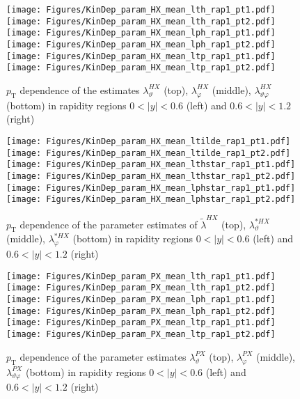 \documentclass[12pt]{article}
\newcommand{\pT}{p_\mathrm{T}}
\newcommand{\absy}{\left |  y \right |}
\newcommand{\lamthHX}{\lambda^{\scriptscriptstyle HX}_\vartheta}
\newcommand{\lamphHX}{\lambda^{\scriptscriptstyle HX}_\varphi}
\newcommand{\lamthphHX}{\lambda^{\scriptscriptstyle HX}_{\vartheta \varphi}}
\newcommand{\lamtildeHX}{\tilde{\lambda}^{\scriptscriptstyle HX}}
\newcommand{\lamthstarHX}{\lambda^{* \scriptscriptstyle HX}_\vartheta}
\newcommand{\lamphstarHX}{\lambda^{* \scriptscriptstyle HX}_\varphi}
\newcommand{\lamthPX}{\lambda^{\scriptscriptstyle PX}_\vartheta}
\newcommand{\lamphPX}{\lambda^{\scriptscriptstyle PX}_\varphi}
\newcommand{\lamthphPX}{\lambda^{\scriptscriptstyle PX}_{\vartheta \varphi}}
\begin{document}



\begin{figure}[htbp]
\centering
\texttt{[image: Figures/KinDep\_param\_HX\_mean\_lth\_rap1\_pt1.pdf]}
\texttt{[image: Figures/KinDep\_param\_HX\_mean\_lth\_rap1\_pt2.pdf]}
\texttt{[image: Figures/KinDep\_param\_HX\_mean\_lph\_rap1\_pt1.pdf]}
\texttt{[image: Figures/KinDep\_param\_HX\_mean\_lph\_rap1\_pt2.pdf]}
\texttt{[image: Figures/KinDep\_param\_HX\_mean\_ltp\_rap1\_pt1.pdf]}
\texttt{[image: Figures/KinDep\_param\_HX\_mean\_ltp\_rap1\_pt2.pdf]}
\caption{$\pT$ dependence of the estimates $\lamthHX$ (top), $\lamphHX$ (middle), $\lamthphHX$ (bottom) in rapidity regions $0<\absy<0.6$ (left) and $0.6<\absy<1.2$ (right)}
\end{figure}
\clearpage

\begin{figure}[htbp]
\centering
\texttt{[image: Figures/KinDep\_param\_HX\_mean\_ltilde\_rap1\_pt1.pdf]}
\texttt{[image: Figures/KinDep\_param\_HX\_mean\_ltilde\_rap1\_pt2.pdf]}
\texttt{[image: Figures/KinDep\_param\_HX\_mean\_lthstar\_rap1\_pt1.pdf]}
\texttt{[image: Figures/KinDep\_param\_HX\_mean\_lthstar\_rap1\_pt2.pdf]}
\texttt{[image: Figures/KinDep\_param\_HX\_mean\_lphstar\_rap1\_pt1.pdf]}
\texttt{[image: Figures/KinDep\_param\_HX\_mean\_lphstar\_rap1\_pt2.pdf]}
\caption{$\pT$ dependence of the parameter estimates of $\lamtildeHX$ (top),
$\lamthstarHX$ (middle), $\lamphstarHX$ (bottom) in rapidity regions $0<\absy<0.6$ (left) and $0.6<\absy<1.2$ (right)}
\end{figure}
\clearpage









\begin{figure}[htbp]
\centering
\texttt{[image: Figures/KinDep\_param\_PX\_mean\_lth\_rap1\_pt1.pdf]}
\texttt{[image: Figures/KinDep\_param\_PX\_mean\_lth\_rap1\_pt2.pdf]}
\texttt{[image: Figures/KinDep\_param\_PX\_mean\_lph\_rap1\_pt1.pdf]}
\texttt{[image: Figures/KinDep\_param\_PX\_mean\_lph\_rap1\_pt2.pdf]}
\texttt{[image: Figures/KinDep\_param\_PX\_mean\_ltp\_rap1\_pt1.pdf]}
\texttt{[image: Figures/KinDep\_param\_PX\_mean\_ltp\_rap1\_pt2.pdf]}
\caption{$\pT$ dependence of the parameter estimates $\lamthPX$ (top), $\lamphPX$ (middle), $\lamthphPX$ (bottom) in rapidity regions $0<\absy<0.6$ (left) and $0.6<\absy<1.2$ (right)}
\end{figure}
\clearpage
\end{document}
